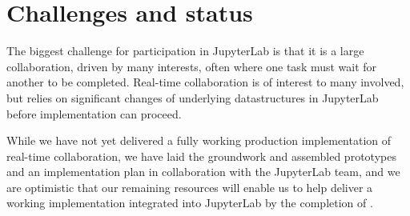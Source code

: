 \documentclass{deliverablereport}
\begin{document}
\section{Challenges and status}

The biggest challenge for \ODK participation in JupyterLab is that it is a large collaboration, driven by many interests,
often where one task must wait for another to be completed.
Real-time collaboration is of interest to many involved,
but relies on significant changes of underlying datastructures in JupyterLab before implementation can proceed.

While we have not yet delivered a fully working production implementation of real-time collaboration,
we have laid the groundwork and assembled prototypes and an implementation plan
in collaboration with the JupyterLab team,
and we are optimistic that our remaining resources will enable us to help deliver a working implementation integrated into JupyterLab by the completion of .
\end{document}
